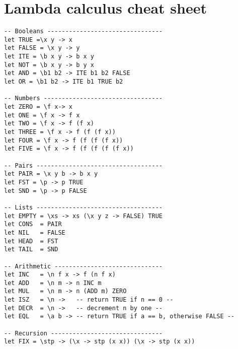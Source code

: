 \documentclass[paper=letter, fontsize=13pt]{article} %
\numberwithin{equation}{section} %
\begin{document}
\section{Lambda calculus cheat sheet}
\begin{lstlisting}
-- Booleans --------------------------------
let TRUE =\x y -> x
let FALSE = \x y -> y
let ITE = \b x y -> b x y
let NOT = \b x y -> b y x
let AND = \b1 b2 -> ITE b1 b2 FALSE 
let OR = \b1 b2 -> ITE b1 TRUE b2

-- Numbers ---------------------------------
let ZERO = \f x-> x
let ONE = \f x -> f x 
let TWO = \f x -> f (f x) 
let THREE = \f x -> f (f (f x))
let FOUR = \f x -> f (f (f (f x))
let FIVE = \f x -> f (f (f (f (f x))

-- Pairs -----------------------------------
let PAIR = \x y b -> b x y 
let FST = \p -> p TRUE 
let SND = \p -> p FALSE

-- Lists -----------------------------------
let EMPTY = \xs -> xs (\x y z -> FALSE) TRUE
let CONS  = PAIR
let NIL   = FALSE
let HEAD  = FST
let TAIL  = SND

-- Arithmetic ------------------------------
let INC   = \n f x -> f (n f x)
let ADD   = \n m -> n INC m 
let MUL   = \n m -> n (ADD m) ZERO
let ISZ   = \n ->   -- return TRUE if n == 0 --
let DECR  = \n ->   -- decrement n by one --  
let EQL   = \a b -> -- return TRUE if a == b, otherwise FALSE --

-- Recursion -------------------------------
let FIX = \stp -> (\x -> stp (x x)) (\x -> stp (x x))
\end{lstlisting}

\newpage
\end{document}
